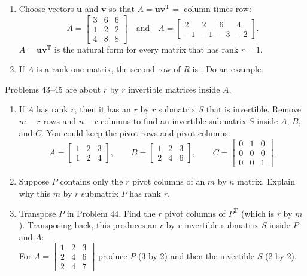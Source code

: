 \documentclass[14pt, a4paper]{article}
\begin{document}
\begin{enumerate}[resume]
    \item Choose vectors $\mathbf{u}$ and $\mathbf{v}$ so that $A = \mathbf{u}\mathbf{v}^{\mathrm{T}} = $ column times row:
          \[
              A = \begin{bmatrix} 3 & 6 & 6 \\ 1 & 2 & 2 \\ 4 & 8 & 8 \end{bmatrix} \quad \text{and} \quad
              A = \begin{bmatrix} 2 & 2 & 6 & 4 \\ -1 & -1 & -3 & -2 \end{bmatrix}.
          \]
          $A = \mathbf{u}\mathbf{v}^{\mathrm{T}}$ is the natural form for every matrix that has rank $r=1$.

    \item If $A$ is a rank one matrix, the second row of $R$ is \underline{\hspace{2cm}}. Do an example.
\end{enumerate}
\noindent Problems 43--45 are about $r$ by $r$ invertible matrices inside $A$.
\begin{enumerate}[resume]
    \item If $A$ has rank $r$, then it has an $r$ by $r$ submatrix $S$ that is invertible. Remove $m-r$ rows and $n-r$ columns to find an invertible submatrix $S$ inside $A$, $B$, and $C$. You could keep the pivot rows and pivot columns:
          \[
              A = \begin{bmatrix} 1 & 2 & 3 \\ 1 & 2 & 4 \end{bmatrix}, \qquad
              B = \begin{bmatrix} 1 & 2 & 3 \\ 2 & 4 & 6 \end{bmatrix}, \qquad
              C = \begin{bmatrix} 0 & 1 & 0 \\ 0 & 0 & 0 \\ 0 & 0 & 1 \end{bmatrix}.
          \]
    \item Suppose $P$ contains only the $r$ pivot columns of an $m$ by $n$ matrix. Explain why this $m$ by $r$ submatrix $P$ has rank $r$.
    \item Transpose $P$ in Problem 44. Find the $r$ pivot columns of $P^{\mathrm{T}}$ (which is $r$ by $m$). Transposing back, this produces an $r$ by $r$ invertible submatrix $S$ inside $P$ and $A$: \\
          For $A = \begin{bmatrix} 1 & 2 & 3 \\ 2 & 4 & 6 \\ 2 & 4 & 7 \end{bmatrix}$ produce $P$ (3 by 2) and then the invertible $S$ (2 by 2).
\end{enumerate}
\end{document}
